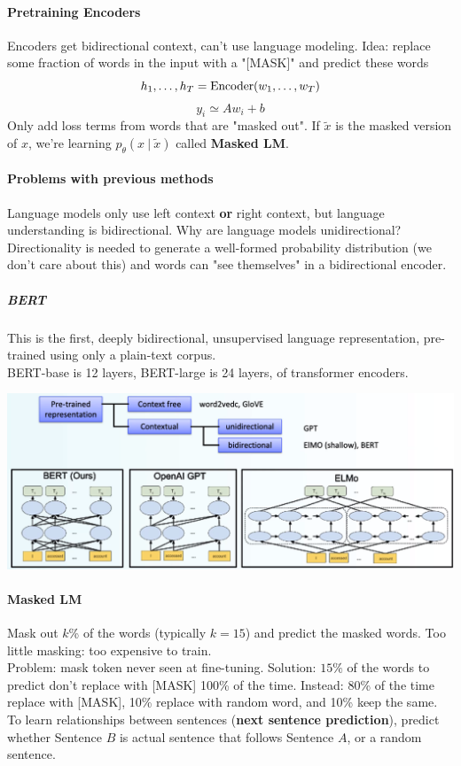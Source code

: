 \documentclass[10pt]{report}
\begin{document}
\paragraph{Pretraining Encoders} Encoders get bidirectional context, can't use language modeling. Idea: replace some fraction of words in the input with a "[MASK]" and predict these words
$$h_1,\ldots,h_T = \hbox{Encoder}(w_1,\ldots,w_T)$$
$$y_i\simeq Aw_i + b$$
Only add loss terms from words that are "masked out". If $\tilde{x}$ is the masked version of $x$, we're learning $p_\theta(x\:|\:\tilde{x})$ called \textbf{Masked LM}.
\paragraph{Problems with previous methods} Language models only use left context \textbf{or} right context, but language understanding is bidirectional. Why are language models unidirectional? Directionality is needed to generate a well-formed probability distribution (we don't care about this) and words can "see themselves" in a bidirectional encoder.
\subparagraph{BERT} This is the first, deeply bidirectional, unsupervised language representation, pre-trained using only a plain-text corpus.\\
BERT-base is 12 layers, BERT-large is 24 layers, of transformer encoders.
\begin{center}
	\includegraphics[scale=0.5]{76.png}
\end{center}
\paragraph{Masked LM} Mask out $k$\% of the words (typically $k=15$) and predict the masked words. Too little masking: too expensive to train.\\
Problem: mask token never seen at fine-tuning. Solution: $15\%$ of the words to predict don't replace with [MASK] 100\% of the time. Instead: 80\% of the time replace with [MASK], 10\% replace with random word, and 10\% keep the same.\\
To learn relationships between sentences (\textbf{next sentence prediction}), predict whether Sentence $B$ is actual sentence that follows Sentence $A$, or a random sentence.
\end{document}
